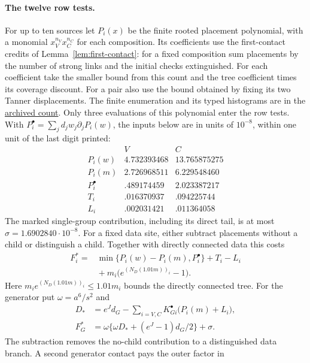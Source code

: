 \documentclass[10pt,twocolumn]{article}
\theoremstyle{definition}
\begin{document}
\paragraph{The twelve row tests.}
For up to ten sources let $P_i(x)$ be the finite rooted placement
polynomial, with a monomial $x_V^{n_V}x_C^{n_C}$ for each composition.
Its coefficients use the first-contact credits of
Lemma~\ref{lem:first-contact}: for a fixed composition sum placements
by the number of strong links and the initial checks extinguished.
For each coefficient take the smaller bound from this count and
the tree coefficient times its coverage discount. For a pair also
use the bound obtained by fixing its two Tanner displacements.
The finite enumeration and its typed histograms are in the
\href{https://github.com/vicenzoscavino1999/ssf-qec-reproduction/blob/circuit-postselection-v3.1/certificados/fibras/proofs/H5A_3_4_esquina_2.txt}{archived count}.
Only three evaluations of this polynomial enter the row tests.
With $P_i^\bullet=\sum_j d_jw_j\partial_jP_i(w)$, the inputs below
are in units of $10^{-8}$, within one unit of the last digit printed:
\[
\begin{array}{c|rr}
 &V&C\\ \hline
 P_i(w)&4.732393468&13.765875275\\
 P_i(m)&2.726968511&6.229548460\\
 P_i^\bullet&.489174459&2.023387217\\
 T_i&.016370937&.094225744\\
 L_i&.002031421&.011364058
\end{array}
\]
The marked single-group contribution, including its direct tail, is
at most $\sigma=1.6902840\cdot10^{-8}$.
For a fixed data site, either subtract placements without a child or
distinguish a child. Together with directly connected data this costs
\[
\begin{aligned}
 F_i^*={}&\min\{P_i(w)-P_i(m),P_i^\bullet\}+T_i-L_i\\
           &{}+m_i\big(e^{(N_D(1.01m))_i}-1\big).
\end{aligned}
\]
Here $m_i e^{(N_D(1.01m))_i}\le1.01m_i$ bounds the directly
connected tree. For the generator put $\omega=a^6/s^2$ and
\[
\begin{aligned}
 D_* &=e^J d_G-\sum_{i=V,C}K^\bullet_{Gi}\big(P_i(m)+L_i\big),\\
 F_G^*&=\omega\{\omega D_*+(e^J-1)d_G/2\}+\sigma .
\end{aligned}
\]
The subtraction removes the no-child contribution to a distinguished
data branch. A second generator contact pays the outer factor in
\end{document}
